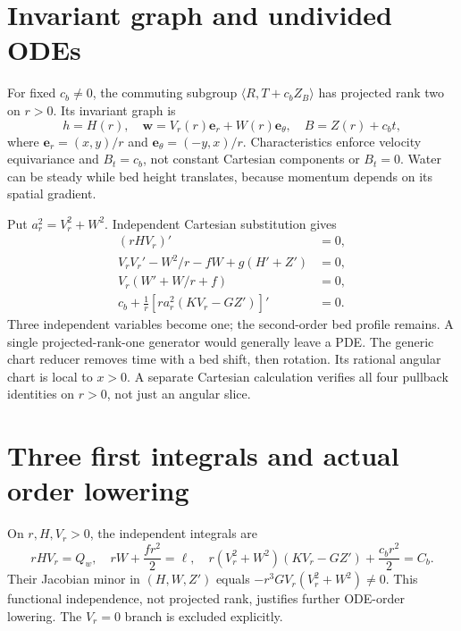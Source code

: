 \documentclass[11pt,a4paper,oneside]{report}
\numberwithin{equation}{chapter}
\begin{document}
\section{Invariant graph and undivided ODEs}
For fixed $c_b\ne0$, the commuting subgroup
$\langle R,T+c_bZ_B\rangle$ has projected rank two on $r>0$.
Its invariant graph is
\begin{equation}\label{eq:2dansatz}
h=H(r),\quad
\mathbf w=V_r(r)\mathbf e_r+W(r)\mathbf e_\theta,\quad
B=Z(r)+c_bt,
\end{equation}
where $\mathbf e_r=(x,y)/r$ and $\mathbf e_\theta=(-y,x)/r$.
Characteristics enforce velocity equivariance and $B_t=c_b$, not constant
Cartesian components or $B_t=0$. Water can be steady while bed height
translates, because momentum depends on its spatial gradient.

Put $a_r^2=V_r^2+W^2$. Independent Cartesian substitution gives
\begin{equation}\label{eq:2dode}
\begin{aligned}
(rHV_r)'&=0,\\
V_rV_r'-W^2/r-fW+g(H'+Z')&=0,\\
V_r(W'+W/r+f)&=0,\\
c_b+\frac1r[r a_r^2(KV_r-GZ')]'&=0.
\end{aligned}
\end{equation}
Three independent variables become one; the second-order bed profile
remains. A single projected-rank-one generator would generally leave a PDE.
The generic chart reducer removes time with a bed shift, then rotation.
Its rational angular chart is local to $x>0$. A separate Cartesian
calculation verifies all four pullback identities on $r>0$, not just an
angular slice.

\section{Three first integrals and actual order lowering}
On $r,H,V_r>0$, the independent integrals are
\begin{equation}\label{eq:annular-integrals}
rHV_r=Q_w,\quad
rW+\frac{fr^2}{2}=\ell,\quad
r(V_r^2+W^2)(KV_r-GZ')+\frac{c_br^2}{2}=C_b.
\end{equation}
Their Jacobian minor in $(H,W,Z')$ equals
$-r^3GV_r(V_r^2+W^2)\ne0$.
This functional independence, not projected rank, justifies further
ODE-order lowering. The $V_r=0$ branch is excluded explicitly.
\end{document}

